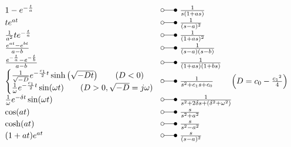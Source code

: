 \[ \begin{array}{@{}l@{ ~ \laplace ~ }l@{}}
1 - e^{-\frac{t}{a}} &
    \frac{1}{s (1 + as)} \\
t e^{at} &
    \frac{1}{(s - a)^2} \\
\frac{1}{a^2} t e^{-\frac{t}{a}} &
    \frac{1}{(1 + as)^2} \\
\frac{e^{at} - e^{bt}}{a - b} &
    \frac{1}{(s - a) (s - b)} \\
\frac{e^{-\frac{t}{a}} - e^{-\frac{t}{b}}}{a - b} &
    \frac{1}{(1 + as) (1 + bs)} \\
\left\lbrace\begin{array}{@{}l}
\frac{1}{\sqrt{-D}} e^{-\frac{c_1}{2}t} \sinh\left(\sqrt{-Dt}\right) \qquad (D < 0) \\
\frac{1}{\omega} e^{-\frac{c_1}{2}t} \sin(\omega t)                  \qquad (D > 0, \sqrt{-D} = j \omega)
\end{array}\right. &
    \frac{1}{s^2 + c_1 s + c_0} \qquad \left(D = c_0 - \frac{{c_1}^2}{4}\right) \\
\frac{1}{\omega} e^{-\delta t} \sin(\omega t) &
    \frac{1}{s^2 + 2 \delta s + (\delta^2 + \omega^2)} \\
\cos(a t) &
    \frac{s}{s^2 + a^2} \\
\cosh(a t) &
    \frac{s}{s^2 - a^2} \\
(1 + a t) e^{a t} &
    \frac{s}{(s - a)^2} \\
\end{array} \]

